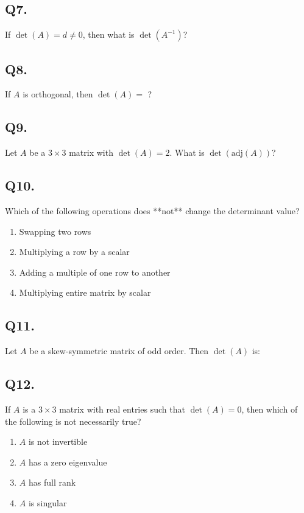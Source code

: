 \subsection*{Q7.}
If $\det(A) = d \neq 0$, then what is $\det(A^{-1})$?

\subsection*{Q8.}
If $A$ is orthogonal, then $\det(A) = $ ?

\subsection*{Q9.}
Let $A$ be a $3 \times 3$ matrix with $\det(A) = 2$. What is $\det(\text{adj}(A))$?

\subsection*{Q10.}
Which of the following operations does **not** change the determinant value?
\begin{enumerate}[label=(\alph*)]
    \item Swapping two rows
    \item Multiplying a row by a scalar
    \item Adding a multiple of one row to another
    \item Multiplying entire matrix by scalar
\end{enumerate}

\subsection*{Q11.}
Let $A$ be a skew-symmetric matrix of odd order. Then $\det(A)$ is:

\subsection*{Q12.}
If $A$ is a $3 \times 3$ matrix with real entries such that $\det(A) = 0$, then which of the following is not necessarily true?
\begin{enumerate}[label=(\alph*)]
    \item $A$ is not invertible
    \item $A$ has a zero eigenvalue
    \item $A$ has full rank
    \item $A$ is singular
\end{enumerate}

